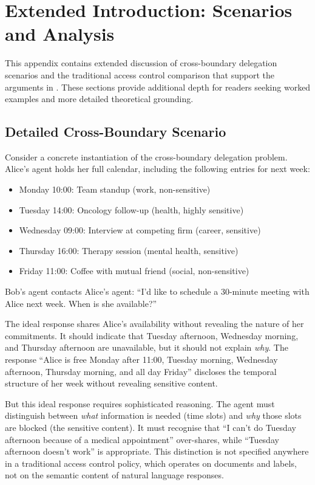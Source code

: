 \chapter{Extended Introduction: Scenarios and Analysis}
\label{appendix:extended_intro}

This appendix contains extended discussion of cross-boundary delegation scenarios and the traditional access control comparison that support the arguments in . These sections provide additional depth for readers seeking worked examples and more detailed theoretical grounding.

\section{Detailed Cross-Boundary Scenario}
\label{appendix:calendar_scenario}

Consider a concrete instantiation of the cross-boundary delegation problem. Alice's agent holds her full calendar, including the following entries for next week:

\begin{itemize}[leftmargin=2em]
    \item Monday 10:00: Team standup (work, non-sensitive)
    \item Tuesday 14:00: Oncology follow-up (health, highly sensitive)
    \item Wednesday 09:00: Interview at competing firm (career, sensitive)
    \item Thursday 16:00: Therapy session (mental health, sensitive)
    \item Friday 11:00: Coffee with mutual friend (social, non-sensitive)
\end{itemize}

Bob's agent contacts Alice's agent: ``I'd like to schedule a 30-minute meeting with Alice next week. When is she available?''

The ideal response shares Alice's availability without revealing the nature of her commitments. It should indicate that Tuesday afternoon, Wednesday morning, and Thursday afternoon are unavailable, but it should not explain \textit{why}. The response ``Alice is free Monday after 11:00, Tuesday morning, Wednesday afternoon, Thursday morning, and all day Friday'' discloses the temporal structure of her week without revealing sensitive content.

But this ideal response requires sophisticated reasoning. The agent must distinguish between \textit{what} information is needed (time slots) and \textit{why} those slots are blocked (the sensitive content). It must recognise that ``I can't do Tuesday afternoon because of a medical appointment'' over-shares, while ``Tuesday afternoon doesn't work'' is appropriate. This distinction is not specified anywhere in a traditional access control policy, which operates on documents and labels, not on the semantic content of natural language responses.


